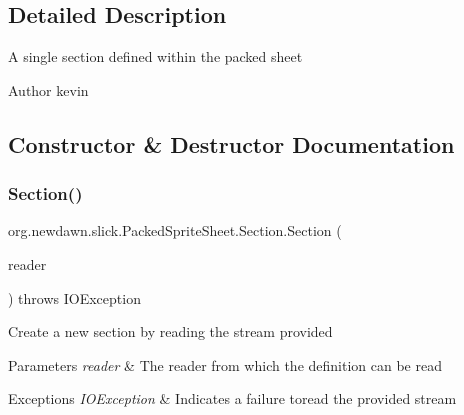 \subsection{Detailed Description}
A single section defined within the packed sheet

\begin{DoxyAuthor}{Author}
kevin 
\end{DoxyAuthor}


\subsection{Constructor \& Destructor Documentation}
\mbox{\label{classorg_1_1newdawn_1_1slick_1_1_packed_sprite_sheet_1_1_section_a5fce67d90dcd951945532a9711f6c5d9}} 
\subsubsection{\texorpdfstring{Section()}{Section()}}
{\footnotesize\ttfamily org.\+newdawn.\+slick.\+Packed\+Sprite\+Sheet.\+Section.\+Section (\begin{DoxyParamCaption}\item[{Buffered\+Reader}]{reader }\end{DoxyParamCaption}) throws I\+O\+Exception\hspace{0.3cm}{\ttfamily [inline]}}

Create a new section by reading the stream provided


\begin{DoxyParams}{Parameters}
{\em reader} & The reader from which the definition can be read \\
\hline
\end{DoxyParams}

\begin{DoxyExceptions}{Exceptions}
{\em I\+O\+Exception} & Indicates a failure toread the provided stream \\
\hline
\end{DoxyExceptions}

